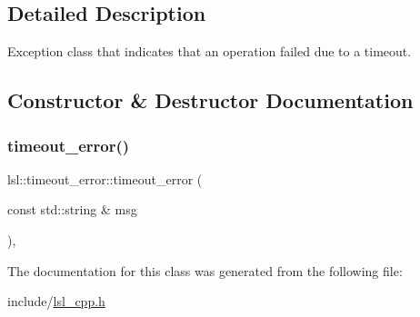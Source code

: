 \subsection{Detailed Description}
Exception class that indicates that an operation failed due to a timeout. 

\subsection{Constructor \& Destructor Documentation}
\mbox{\label{classlsl_1_1timeout__error_afbc3b7c957fe3da4021aff3c30e6192f}} 
\subsubsection{\texorpdfstring{timeout\+\_\+error()}{timeout\_error()}}
{\footnotesize\ttfamily lsl\+::timeout\+\_\+error\+::timeout\+\_\+error (\begin{DoxyParamCaption}\item[{const std\+::string \&}]{msg }\end{DoxyParamCaption})\hspace{0.3cm}{\ttfamily [inline]}, {\ttfamily [explicit]}}



The documentation for this class was generated from the following file\+:\begin{DoxyCompactItemize}
\item 
include/\hyperlink{lsl__cpp_8h}{lsl\+\_\+cpp.\+h}\end{DoxyCompactItemize}
